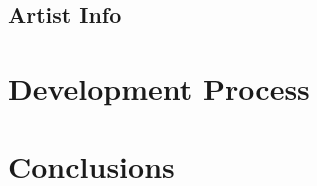 
  \subsection{Artist Info} %
    \label{sub:artist_info}
  




\section{Development Process} %
  \label{sec:development_process}

    



\section{Conclusions} %
  \label{sec:conclusions}



